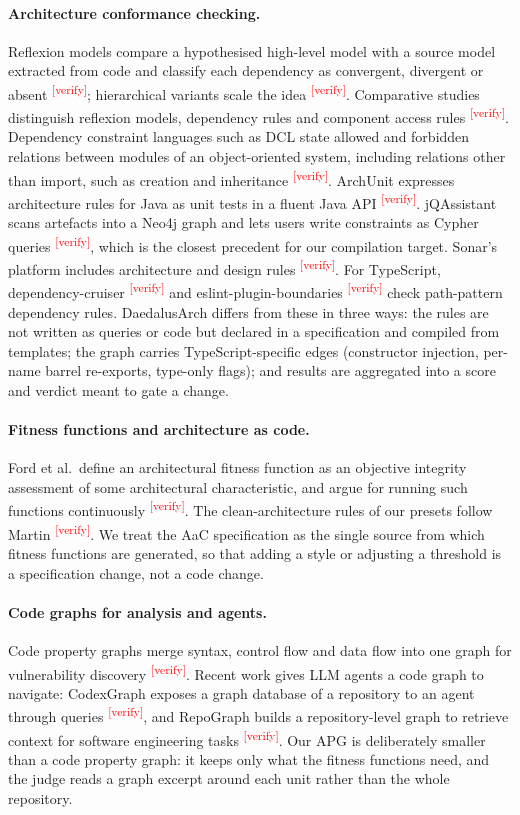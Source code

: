 \documentclass[10pt,a4paper]{article}
\newcommand{\citeneeded}[1]{\cite{#1}\textsuperscript{\textcolor{red}{\tiny[verify]}}}
\newcommand{\tool}{DaedalusArch}
\newcommand{\dc}{dependency-cruiser}
\begin{document}
\paragraph{Architecture conformance checking.}
Reflexion models compare a hypothesised high-level model with a source model extracted from code and classify each
dependency as convergent, divergent or absent \citeneeded{murphy1995reflexion}; hierarchical variants scale the idea
\citeneeded{koschke2003hierarchical}. Comparative studies distinguish reflexion models, dependency rules and
component access rules \citeneeded{knodel2007comparison,passos2010static}. Dependency constraint languages such as
DCL state allowed and forbidden relations between modules of an object-oriented system, including relations other
than import, such as creation and inheritance \citeneeded{terra2009dcl}. ArchUnit expresses architecture rules for Java
as unit tests in a fluent Java API \citeneeded{archunit}. jQAssistant scans artefacts into a Neo4j graph and lets
users write constraints as Cypher queries \citeneeded{jqassistant}, which is the closest precedent for our compilation
target. Sonar's platform includes architecture and design rules \citeneeded{sonarqube}. For TypeScript, \dc{}
\citeneeded{depcruise} and eslint-plugin-boundaries \citeneeded{eslintboundaries} check path-pattern dependency rules.
\tool{} differs from these in three ways: the rules are not written as queries or code but declared in a
specification and compiled from templates; the graph carries TypeScript-specific edges (constructor injection,
per-name barrel re-exports, type-only flags); and results are aggregated into a score and verdict meant to gate a
change.

\paragraph{Fitness functions and architecture as code.}
Ford et al.\ define an architectural fitness function as an objective integrity assessment of some architectural
characteristic, and argue for running such functions continuously \citeneeded{ford2017evolutionary,ford2022evolutionary2}.
The clean-architecture rules of our presets follow Martin \citeneeded{martin2017clean}. We treat the AaC
specification as the single source from which fitness functions are generated, so that adding a style or adjusting
a threshold is a specification change, not a code change.

\paragraph{Code graphs for analysis and agents.}
Code property graphs merge syntax, control flow and data flow into one graph for vulnerability discovery
\citeneeded{yamaguchi2014cpg}. Recent work gives LLM agents a code graph to navigate: CodexGraph exposes a graph
database of a repository to an agent through queries \citeneeded{liu2024codexgraph}, and RepoGraph builds a
repository-level graph to retrieve context for software engineering tasks \citeneeded{ouyang2024repograph}. Our APG
is deliberately smaller than a code property graph: it keeps only what the fitness functions need, and the judge
reads a graph excerpt around each unit rather than the whole repository.
\end{document}
